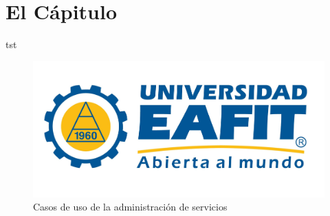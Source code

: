 \chapter{El Cápitulo}

tst\cite{scavuzzoalgoritmos}

\begin{figure}[h]
\begin{center}
  \includegraphics[width=\textwidth]{aux/Logo_EAFIT}
  \caption{Casos de uso de la administración de servicios}
  \label{figCasosUso}
\end{center}
\end{figure}